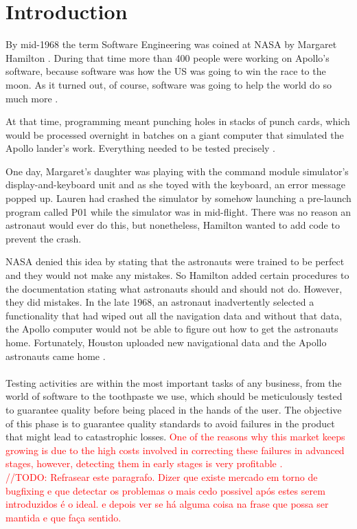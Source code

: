 \chapter{Introduction}
\label{ch:1}


By mid-1968 the term Software Engineering was coined at NASA by Margaret Hamilton \cite{first_sw_engineer}. During that time more than 400 people were working on Apollo’s software, because software was how the US was going to win the race to the moon. As it turned out, of course, software was going to help the world do so much more \cite{mcmillan_her_nodate}. 

At that time, programming meant punching holes in stacks of punch cards, which would be processed overnight in batches on a giant computer that simulated the Apollo lander’s work. Everything needed to be tested precisely \cite{mcmillan_her_nodate}.

One day, Margaret’s daughter was playing with the command module simulator’s display-and-keyboard unit and as she toyed with the keyboard, an error message popped up. Lauren had crashed the simulator by somehow launching a pre-launch program called P01 while the simulator was in mid-flight. There was no reason an astronaut would ever do this, but nonetheless, Hamilton wanted to add code to prevent the crash.

NASA denied this idea by stating that the astronauts were trained to be perfect and they would not make any mistakes. So Hamilton added certain procedures to the documentation stating what astronauts should and should not do. However, they did mistakes. In the late 1968, an astronaut inadvertently selected a functionality that had wiped out all the navigation data and without that data, the Apollo computer would not be able to figure out how to get the astronauts home. Fortunately, Houston uploaded new navigational data and the Apollo astronauts came home \cite{first_sw_engineer} \cite{mcmillan_her_nodate}.\\

\\Testing activities are within the most important tasks of any business, from the world of software to the toothpaste we use, which should be meticulously tested to guarantee quality before being placed in the hands of the user. The objective of this phase is to guarantee quality standards to avoid failures in the product that might lead to catastrophic losses. \textcolor{red}{One of the reasons why this market keeps growing is due to the high costs involved in correcting these failures in advanced stages, however, detecting them in early stages is very profitable \cite{hernandez_history_2020}.
\\ //TODO: Refrasear este paragrafo. Dizer que existe mercado em torno de bugfixing e que detectar os problemas o mais cedo possivel após estes serem introduzidos é o ideal. e depois ver se há alguma coisa na frase que possa ser mantida e que faça sentido.}


